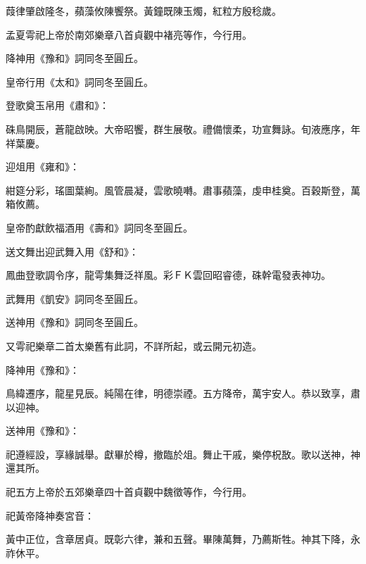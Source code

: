 \begin{pinyinscope}
 葭律肇啟隆冬，蘋藻攸陳饗祭。黃鐘既陳玉燭，紅粒方殷稔歲。



 孟夏雩祀上帝於南郊樂章八首貞觀中褚亮等作，今行用。



 降神用《豫和》詞同冬至圓丘。



 皇帝行用《太和》詞同冬至圓丘。



 登歌奠玉帛用《肅和》：



 硃鳥開辰，蒼龍啟映。大帝昭饗，群生展敬。禮備懷柔，功宣舞詠。旬液應序，年祥葉慶。



 迎俎用《雍和》：



 紺筵分彩，瑤圖葉絢。風管晨凝，雲歌曉囀。肅事蘋藻，虔申桂奠。百穀斯登，萬箱攸薦。



 皇帝酌獻飲福酒用《壽和》詞同冬至圓丘。



 送文舞出迎武舞入用《舒和》：



 鳳曲登歌調令序，龍雩集舞泛祥風。彩ＦＫ雲回昭睿德，硃幹電發表神功。



 武舞用《凱安》詞同冬至圓丘。



 送神用《豫和》詞同冬至圓丘。



 又雩祀樂章二首太樂舊有此詞，不詳所起，或云開元初造。



 降神用《豫和》：



 鳥緯遷序，龍星見辰。純陽在律，明德崇禋。五方降帝，萬宇安人。恭以致享，肅以迎神。



 送神用《豫和》：



 祀遵經設，享緣誠舉。獻畢於樽，撤臨於俎。舞止干戚，樂停柷敔。歌以送神，神還其所。



 祀五方上帝於五郊樂章四十首貞觀中魏徵等作，今行用。



 祀黃帝降神奏宮音：



 黃中正位，含章居貞。既彰六律，兼和五聲。畢陳萬舞，乃薦斯牲。神其下降，永祚休平。




\end{pinyinscope}
